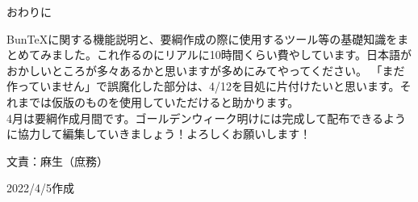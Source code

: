 \documentclass[b4paper,landscape, 8pt, nomag, dvipdfmx, papersize, uplatex]{jsarticle}
\renewcommand{\section}[1]{\vspace{3truemm} \ascboxD[D]{\fontsize{11truept}{12truept}\selectfont #1}}
\newcommand{\responsibility}[2]{\begin{flushright} 文責：#1（#2） \end{flushright}}
\renewcommand{\section}[1]{\vspace{-2truemm} \begin{center}{\fontsize{14truept}{10truemm}\selectfont #1}\end{center}\vspace{2truemm}}
\begin{document}
\begin{multicols*}{4}
\newcolumn
\section{おわりに}
\hspace{1zw}BunTeXに関する機能説明と、要綱作成の際に使用するツール等の基礎知識をまとめてみました。これ作るのにリアルに10時間くらい費やしています。日本語がおかしいところが多々あるかと思いますが多めにみてやってください。
「まだ作っていません」で誤魔化した部分は、4/12を目処に片付けたいと思います。それまでは仮版のものを使用していただけると助かります。\\
\indent 4月は要綱作成月間です。ゴールデンウィーク明けには完成して配布できるように協力して編集していきましょう！よろしくお願いします！

\responsibility{麻生}{庶務}
\begin{flushright}
    2022/4/5作成
\end{flushright}

\end{multicols*}
\end{document}
